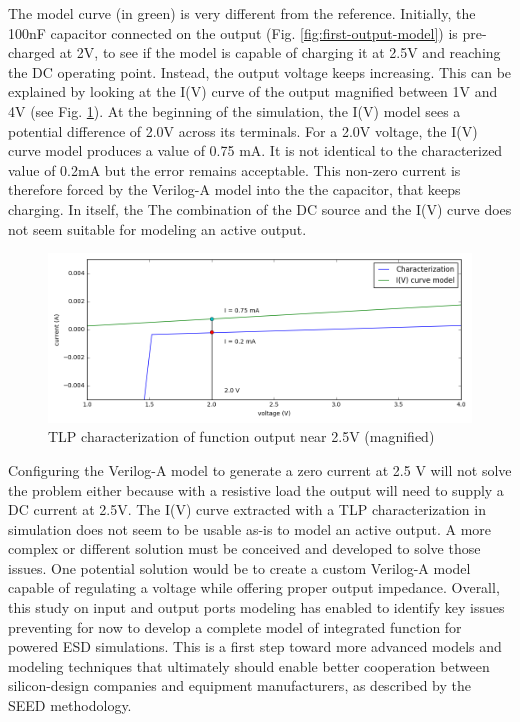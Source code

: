 The model curve (in green) is very different from the reference.
Initially, the 100nF capacitor connected on the output (Fig. \ref{fig:first-output-model}) is pre-charged at 2V, to see if the model is capable of charging it at 2.5V and reaching the DC operating point.
Instead, the output voltage keeps increasing.
This can be explained by looking at the I(V) curve of the output magnified between 1V and 4V (see Fig. \ref{fig:tlp-output-cz-zoomed}).
At the beginning of the simulation, the I(V) model sees a potential difference of 2.0V across its terminals.
For a 2.0V voltage, the I(V) curve model produces a value of 0.75 mA.
It is not identical to the characterized value of 0.2mA but the error remains acceptable.
This non-zero current is therefore forced by the Verilog-A model into the the capacitor, that keeps charging.
In itself, the
The combination of the DC source and the I(V) curve does not seem suitable for modeling an active output.

\begin{figure}[!h]
  \centering
  \includegraphics[width=\textwidth]{src/4/figures/tlp_output_characterization_magnified.png}
  \caption{TLP characterization of function output near 2.5V (magnified)}
  \label{fig:tlp-output-cz-zoomed}
\end{figure}

Configuring the Verilog-A model to generate a zero current at 2.5 V will not solve the problem either because with a resistive load the output will need to supply a DC current at 2.5V.
The I(V) curve extracted with a TLP characterization in simulation does not seem to be usable as-is to model an active output.
A more complex or different solution must be conceived and developed to solve those issues.
One potential solution would be to create a custom Verilog-A model capable of regulating a voltage while offering proper output impedance.
Overall, this study on input and output ports modeling has enabled to identify key issues preventing for now to develop a complete model of integrated function for powered ESD simulations.
This is a first step toward more advanced models and modeling techniques that ultimately should enable better cooperation between silicon-design companies and equipment manufacturers, as described by the SEED methodology.

